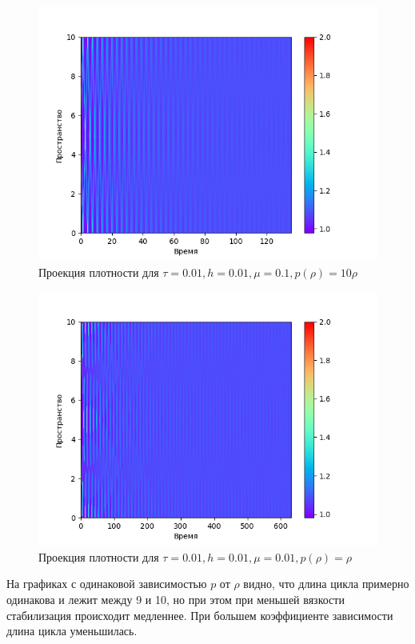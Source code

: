 \documentclass[12pt,a4paper]{article}
\begin{document}
\begin{center}
\begin{figure}[H]
    \centering
    \includegraphics[height=0.4\textheight]{pics/task2/h-2-2-12_1.png}
    \caption{Проекция плотности для $\tau = 0.01, h = 0.01, \mu = 0.1, p(\rho) = 10\rho$}
\end{figure}

\begin{figure}[H]
    \centering
    \includegraphics[height=0.4\textheight]{pics/task2/h-2-2-21_1.png}
    \caption{Проекция плотности для $\tau = 0.01, h = 0.01, \mu = 0.01, p(\rho) = \rho$}
\end{figure}
\end{center}

На графиках с одинаковой зависимостью $p$ от $\rho$ видно, что длина цикла примерно одинакова и лежит между 9 и 10, но при этом при меньшей вязкости стабилизация происходит медленнее. При большем коэффициенте зависимости длина цикла уменьшилась.
\end{document}
